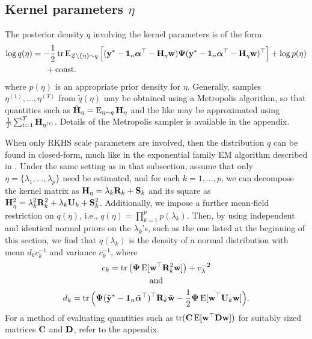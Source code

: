\subsection{Kernel parameters $\eta$}
\label{sec:varupdeta}

The posterior density $q$ involving the kernel parameters is of the form
\begin{align*}
  \log q(\eta) 
  &=  -\frac{1}{2}\operatorname{tr}\operatorname{E}_{{\mathcal Z}\backslash\{\eta\}\sim q} \Big[ 
  ({\mathbf y}^* - {\mathbf 1}_n{\bm\alpha}^\top - {\mathbf H}_\eta{\mathbf w}) {\bm\Psi} ({\mathbf y}^* - {\mathbf 1}_n{\bm\alpha}^\top - {\mathbf H}_\eta{\mathbf w})^\top \Big] + \log p(\eta) \\
  &\phantom{==} + \text{const.}\hspace{0.01em}
\end{align*}
where $p(\eta)$ is an appropriate prior density for $\eta$.
Generally, samples $\eta^{(1)},\dots,\eta^{(T)}$ from $\tilde q(\eta)$ may be obtained using a Metropolis algorithm, so that quantities such as $\tilde{{\mathbf H}}_{\eta} = \operatorname{E}_{\eta \sim q} {\mathbf H}_{\eta}$ and the like may be approximated using $\frac{1}{T}\sum_{t=1}^T {\mathbf H}_{\eta^{(t)}}$.
Details of the Metropolis sampler is available in the appendix.

When only RKHS scale parameters are involved, then the distribution $q$ can be found in closed-form, much like in the exponential family EM algorithm described in .
Under the same setting as in that subsection, assume that only $\eta = \{\lambda_1,\dots,\lambda_p\}$ need be estimated, and for each $k=1,\dots,p$, we can decompose the kernel matrix as ${\mathbf H}_\eta = \lambda_k {\mathbf R}_k + {\mathbf S}_k$ and its square as ${\mathbf H}_\eta^2 = \lambda_k^2 {\mathbf R}_k^2 + \lambda_k {\mathbf U}_k + {\mathbf S}_k^2$.
Additionally, we impose a further mean-field restriction on $q(\eta)$, i.e., $q(\eta) = \prod_{k=1}^p p(\lambda_k)$.
Then, by using independent and identical normal priors on the $\lambda_k$'s, such as the one listed at the beginning of this section, we find that $q(\lambda_k)$ is the density of a normal distribution with mean $d_kc_k^{-1}$ and variance $c_k^{-1}$, where
\begin{gather*}
  c_k = \operatorname{tr}\big({\bm\Psi}\operatorname{E}[{\mathbf w}^\top{\mathbf R}_k^2{\mathbf w}]\big) + v_\lambda^{-2} \\
  \hspace{0.5cm}\text{and}\hspace{0.5cm} \\
  d_k = \operatorname{tr}\Big({\bm\Psi}(\tilde{{\mathbf y}}^* - {\mathbf 1}_n\tilde{{\bm\alpha}}^\top)^\top{\mathbf R}_k \tilde{{\mathbf w}} 
  - \frac{1}{2}{\bm\Psi}\operatorname{E}[{\mathbf w}^\top {\mathbf U}_k {\mathbf w}] \Big). 
\end{gather*}
For a method of evaluating quantities such as $\operatorname{tr}({\mathbf C}\operatorname{E}[{\mathbf w}^\top{\mathbf D}{\mathbf w} ])$ for suitably sized matrices ${\mathbf C}$ and ${\mathbf D}$, refer to the appendix.

